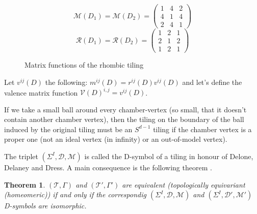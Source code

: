 \documentclass[12pt,a4paper]{article}
\numberwithin{equation}{section}
\theoremstyle{plain}%
\newtheorem{thm}{Theorem}[section]
\theoremstyle{definition}
\theoremstyle{remark}
\begin{document}
\begin{figure}
  \caption{\label{fig:rhombic_mx} Matrix functions of the rhombic tiling}
  \begin{equation*}
    \mathcal{M}(D_1)=\mathcal{M}(D_2)=
    \left(
    \begin{array}{cccc}
      1 & 4 & 2\\
      4 & 1 & 4\\
      2 & 4 & 1
    \end{array}
    \right)
  \end{equation*}
  \begin{equation*}
    \mathcal{R}(D_1)=\mathcal{R}(D_2)=
    \left(
    \begin{array}{cccc}
      1 & 2 & 1\\
      2 & 1 & 2\\
      1 & 2 & 1
    \end{array}
    \right)
  \end{equation*}
\end{figure}

Let $v^{ij}(D)$ the following: $m^{ij}(D)=r^{ij}(D)v^{ij}(D)$ and
let's define the valence matrix function
$\mathcal{V}(D)^{i,j}=v^{ij}(D)$.


If we take a small ball around every chamber-vertex (so small, that it doesn't
contain another chamber vertex), then the tiling on the boundary of the ball
induced by the original tiling must be an $S^{d-1}$ tiling \cite{D87} if the
chamber vertex is a proper one (not an ideal vertex (in infinity) or an
out-of-model vertex).

The triplet $(\Sigma^I,\mathcal{D},\mathcal{M})$ is called the D-symbol of a
tiling in honour of Delone, Delaney and Dress. A main consequence is the
following theorem \cite{D87}.
\begin{thm}
$(\mathcal{T},\Gamma)$ and
$(\mathcal{T}',\Gamma')$ are equivalent (topologically equivariant (homeomeric))
if and only if the correspondig $(\Sigma^I,\mathcal{D},\mathcal{M})$ and
$(\Sigma^I,\mathcal{D}',\mathcal{M}')$ D-symbols are isomorphic.
\end{thm}
\end{document}
